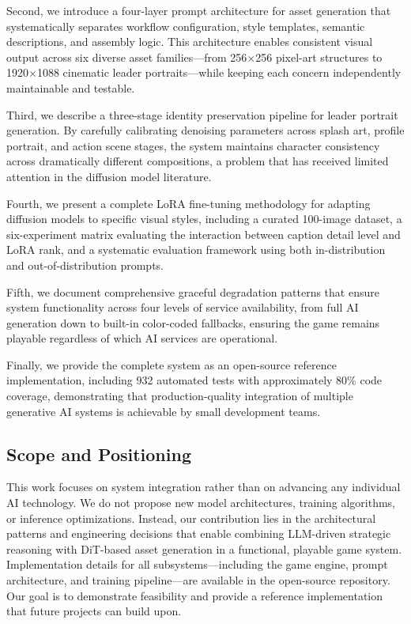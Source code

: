 \documentclass[conference]{IEEEtran}
\begin{document}
Second, we introduce a four-layer prompt architecture for asset generation that systematically separates workflow configuration, style templates, semantic descriptions, and assembly logic. This architecture enables consistent visual output across six diverse asset families---from 256$\times$256 pixel-art structures to 1920$\times$1088 cinematic leader portraits---while keeping each concern independently maintainable and testable.

Third, we describe a three-stage identity preservation pipeline for leader portrait generation. By carefully calibrating denoising parameters across splash art, profile portrait, and action scene stages, the system maintains character consistency across dramatically different compositions, a problem that has received limited attention in the diffusion model literature.

Fourth, we present a complete LoRA fine-tuning methodology for adapting diffusion models to specific visual styles, including a curated 100-image dataset, a six-experiment matrix evaluating the interaction between caption detail level and LoRA rank, and a systematic evaluation framework using both in-distribution and out-of-distribution prompts.

Fifth, we document comprehensive graceful degradation patterns that ensure system functionality across four levels of service availability, from full AI generation down to built-in color-coded fallbacks, ensuring the game remains playable regardless of which AI services are operational.

Finally, we provide the complete system as an open-source reference implementation, including 932 automated tests with approximately 80\% code coverage, demonstrating that production-quality integration of multiple generative AI systems is achievable by small development teams.

\subsection{Scope and Positioning}

This work focuses on system integration rather than on advancing any individual AI technology. We do not propose new model architectures, training algorithms, or inference optimizations. Instead, our contribution lies in the architectural patterns and engineering decisions that enable combining LLM-driven strategic reasoning with DiT-based asset generation in a functional, playable game system. Implementation details for all subsystems---including the game engine, prompt architecture, and training pipeline---are available in the open-source repository. Our goal is to demonstrate feasibility and provide a reference implementation that future projects can build upon.
\end{document}
